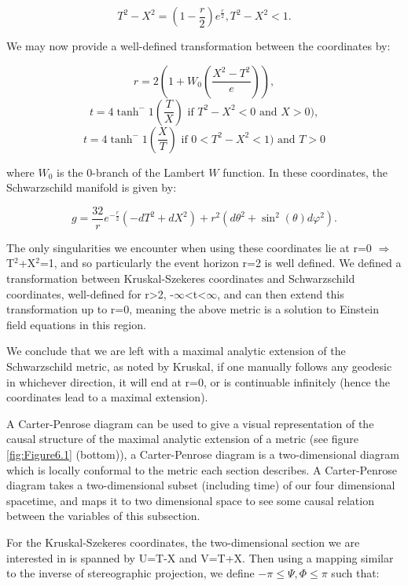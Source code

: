 \documentclass[oneside,openright,frontopenright, singlespacing]{dmathesis}
\begin{document}
	\[T^2-X^2 = \left(1-\frac{r}{2}\right)e^{\frac{r}{2}}, T^2-X^2<1.\]

\vspace{1em}
	We may now provide a well-defined transformation between the coordinates by:

	\[r = 2\left(1+W_0\left(\frac{X^2-T^2}{e}\right)\right),\]
	\[t = 4\tanh^-1\left(\frac{T}{X}\right) \mbox{ if }T^2-X^2<0 \mbox{ and } X>0),\]
	\[t = 4\tanh^-1\left(\frac{X}{T}\right) \mbox{ if }0<T^2-X^2<1) \mbox{ and } T>0\]

	where $W_0$ is the 0-branch of the Lambert $W$ function. In these coordinates, the Schwarzschild manifold is given by:

	\[g = \frac{32}{r}e^{-\frac{r}{2}}(-dT^2+dX^2)+r^2(d\theta^2+\sin^2(\theta)d\varphi^2).\]

\vspace{1em}
	The only singularities we encounter when using these coordinates lie at r=0 $\Rightarrow$ T$^2$+X$^2$=1, and so particularly the event horizon r=2 is well defined. We defined a transformation between Kruskal-Szekeres coordinates and Schwarzschild coordinates, well-defined for r>2, -$\infty$<t<$\infty$, and can then extend this transformation up to r=0, meaning the above metric is a solution to Einstein field equations in this region. 

\vspace{1em}
	We conclude that we are left with a maximal analytic extension of the Schwarzschild metric, as noted by Kruskal, if one manually follows any geodesic in whichever direction, it will end at r=0, or is continuable infinitely (hence the coordinates lead to a maximal extension).

\vspace{1em}
	A Carter-Penrose diagram can be used to give a visual representation of the causal structure of the maximal analytic extension of a metric (see figure \ref{fig:Figure6.1} (bottom)), a Carter-Penrose diagram is a two-dimensional diagram which is locally conformal to the metric each section describes. A Carter-Penrose diagram takes a two-dimensional subset (including time) of our four dimensional spacetime, and maps it to two dimensional space to see some causal relation between the variables of this subsection.

\vspace{1em}
	For the Kruskal-Szekeres coordinates, the two-dimensional section we are interested in is spanned by U=T-X and V=T+X. Then using a mapping similar to the inverse of stereographic projection, we define $-\pi\leq\Psi,\Phi\leq\pi$ such that:
\end{document}
